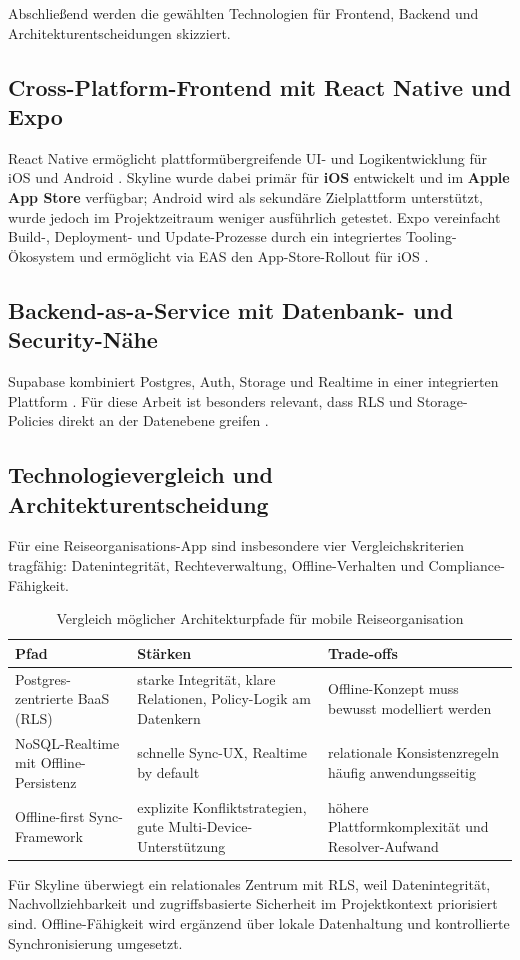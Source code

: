 Abschließend werden die gewählten Technologien für Frontend, Backend und Architekturentscheidungen skizziert.

\subsection{Cross-Platform-Frontend mit React Native und Expo}
React Native ermöglicht plattformübergreifende UI- und Logikentwicklung für
iOS und Android \cite{reactNative}. Skyline wurde dabei primär für \textbf{iOS} entwickelt und im \textbf{Apple App Store} verfügbar; Android wird als sekundäre Zielplattform
unterstützt, wurde jedoch im Projektzeitraum weniger ausführlich getestet.
Expo vereinfacht Build-, Deployment- und Update-Prozesse durch ein integriertes
Tooling-Ökosystem und ermöglicht via EAS den App-Store-Rollout für iOS
\cite{expoDocs,easBuild,easUpdate}.

\subsection{Backend-as-a-Service mit Datenbank- und Security-Nähe}
Supabase kombiniert Postgres, Auth, Storage und Realtime in einer integrierten
Plattform \cite{supabasePlatform}. Für diese Arbeit ist besonders relevant, dass
RLS und Storage-Policies direkt an der Datenebene greifen
\cite{supabaseRLS,supabaseStorage,supabaseAuth}.

\subsection{Technologievergleich und Architekturentscheidung}
Für eine Reiseorganisations-App sind insbesondere vier Vergleichskriterien
tragfähig: Datenintegrität, Rechteverwaltung, Offline-Verhalten und
Compliance-Fähigkeit.

\begin{table}[H]
  \centering
  \caption{Vergleich möglicher Architekturpfade für mobile Reiseorganisation}
  \label{tab:architekturvergleich}
  \begin{tabular}{p{3.1cm}p{4.1cm}p{5.8cm}}
    \textbf{Pfad} & \textbf{Stärken} & \textbf{Trade-offs} \\
    \midrule
    Postgres-zentrierte BaaS (RLS) &
    starke Integrität, klare Relationen, Policy-Logik am Datenkern &
    Offline-Konzept muss bewusst modelliert werden \\
    \midrule
    NoSQL-Realtime mit Offline-Persistenz &
    schnelle Sync-UX, Realtime by default &
    relationale Konsistenzregeln häufig anwendungsseitig \\
    \midrule
    Offline-first Sync-Framework &
    explizite Konfliktstrategien, gute Multi-Device-Unterstützung &
    höhere Plattformkomplexität und Resolver-Aufwand \\
  \end{tabular}
\end{table}

Für Skyline überwiegt ein relationales Zentrum mit RLS, weil Datenintegrität,
Nachvollziehbarkeit und zugriffsbasierte Sicherheit im Projektkontext priorisiert
sind. Offline-Fähigkeit wird ergänzend über lokale Datenhaltung und
kontrollierte Synchronisierung umgesetzt.
